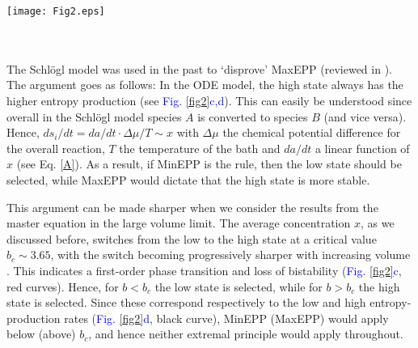 \documentclass[aps,prl,reprint,singlecolumn,superscriptaddress]{revtex4}
\begin{document}
{\begin{figure*}[t]
\texttt{[image: Fig2.eps]}
\caption{{\bf Appearance of Keizer's paradox in Schl\"ogl model.} 
{(a) Gillespie simulations of Schl\"ogl model for $b=4$ and $\Omega=10$.
(b) Histogram of concentration levels for simulation from (a).}
(c) Bifurcation diagram (steady states) from ODE model (black). Average concentration from master equation for $\Omega=10$ (red solid line) 
and $\Omega=100$ (red dashed line). Quantity $b_c\approx 3.65$ represents the critical value (green arrow).
(d) Corresponding entropy production rates. Equilibrium $dS_i/dt=0$ occurs for $b_0=1/6$ (blue arrow).  
(e) Curvature (second spatial derivative) of effective potential from ODE model {evaluated at 
steady state}. Vertical grey dashed lines for guiding the eye. Parameters: $k_{+1}a=0.5, k_{-1}=3$, and $k_{+2}=k_{-2}=1$.}
\label{fig2}
\end{figure*}
\newpage
\ \\
\\
The Schl\"ogl model was used in the past to ‘disprove’ MaxEPP \cite{nicolis77} (reviewed in \cite{vellela09}). The argument goes 
as follows: In the ODE model, the high state always has the higher entropy production (see \textcolor{blue}{Fig. \ref{fig2}c,d}). 
This can easily be understood since overall in the Schl\"ogl model species $A$ is converted to species $B$ (and vice versa). 
Hence, $ds_i/dt = da/dt\cdot\Delta\mu/T\sim x$ with $\Delta\mu$ the chemical potential difference for the overall reaction, $T$ the 
temperature of the bath and $da/dt$ a linear function of $x$ (see Eq. \ref{A}). As a result, if MinEPP is the rule, 
then the low state should be selected, while MaxEPP would dictate that the high state is more stable. 

This argument can be made sharper when we consider the results from the master equation in the large volume limit. The average 
concentration $x$, as we discussed before, switches from the low to the high state at a critical value $b_c\sim 3.65$, with 
the switch becoming progressively sharper with increasing volume \cite{ge09,endres15}. This indicates a first-order phase transition and loss of bistability 
(\textcolor{blue}{Fig. \ref{fig2}c}, red curves). Hence, for $b<b_c$ the low state is selected, while for $b>b_c$ the high state is 
selected. Since these correspond respectively to the low and high entropy-production rates (\textcolor{blue}{Fig. \ref{fig2}d}, 
black curve), MinEPP (MaxEPP) would apply below (above) $b_c$, {and hence neither extremal principle would apply 
throughout.}

}
\end{document}
